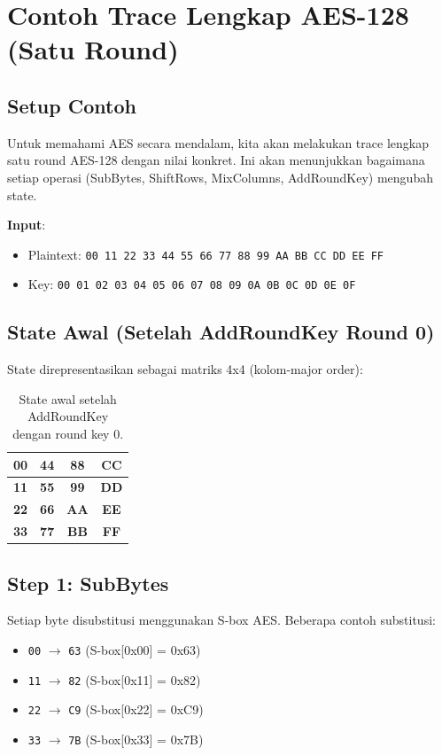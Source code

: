 ﻿\section{Contoh Trace Lengkap AES-128 (Satu Round)}

\subsection{Setup Contoh}

Untuk memahami AES secara mendalam, kita akan melakukan trace lengkap satu round AES-128 dengan nilai konkret. Ini akan menunjukkan bagaimana setiap operasi (SubBytes, ShiftRows, MixColumns, AddRoundKey) mengubah state.

\textbf{Input}:
\begin{itemize}
  \item Plaintext: \texttt{00 11 22 33 44 55 66 77 88 99 AA BB CC DD EE FF}
  \item Key: \texttt{00 01 02 03 04 05 06 07 08 09 0A 0B 0C 0D 0E 0F}
\end{itemize}

\subsection{State Awal (Setelah AddRoundKey Round 0)}

State direpresentasikan sebagai matriks 4x4 (kolom-major order):

\begin{table}[htbp]
  \centering
  \small
  \begin{tabular}{|c|c|c|c|}
    \hline
    \textbf{00} & \textbf{44} & \textbf{88} & \textbf{CC} \\
    \hline
    \textbf{11} & \textbf{55} & \textbf{99} & \textbf{DD} \\
    \hline
    \textbf{22} & \textbf{66} & \textbf{AA} & \textbf{EE} \\
    \hline
    \textbf{33} & \textbf{77} & \textbf{BB} & \textbf{FF} \\
    \hline
  \end{tabular}
  \caption{State awal setelah AddRoundKey dengan round key 0.}
\end{table}

\subsection{Step 1: SubBytes}

Setiap byte disubstitusi menggunakan S-box AES. Beberapa contoh substitusi:
\begin{itemize}
  \item \texttt{00} $\rightarrow$ \texttt{63} (S-box[0x00] = 0x63)
  \item \texttt{11} $\rightarrow$ \texttt{82} (S-box[0x11] = 0x82)
  \item \texttt{22} $\rightarrow$ \texttt{C9} (S-box[0x22] = 0xC9)
  \item \texttt{33} $\rightarrow$ \texttt{7B} (S-box[0x33] = 0x7B)
\end{itemize}

